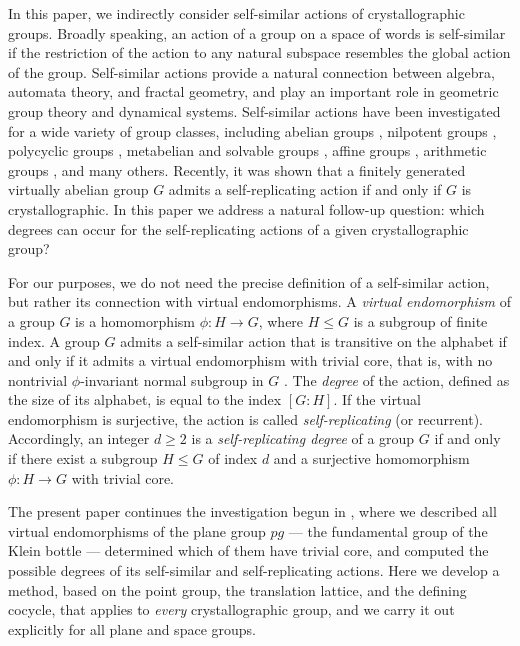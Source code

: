 \documentclass[draft]{adm-paper}
\theoremstyle{definition}
\begin{document}
In this paper, we indirectly consider self-similar actions of crystallographic groups. Broadly speaking, an action of
a group on a space of words is self-similar if the restriction of the action to any natural subspace resembles the
global action of the group. Self-similar actions provide a natural connection between algebra, automata theory, and
fractal geometry, and play an important role in geometric group theory and dynamical systems.
Self-similar actions have been investigated for a wide variety of group classes, including abelian groups
\cite{NekrashevychSidki2004,BrunnerSidki2010Abelian,DantasAtAll2023abelian}, nilpotent groups
\cite{BerlattoSidki2007nilpotent,BondarenkoKravchenko2014nilpotent,Mathieu2021Nilpotent}, polycyclic groups
\cite{DantasAtAll2027polycyclic}, metabelian and solvable groups
\cite{BartholdiSunic,KochloukovaSidki2020metabilian,BerlattoAtAll2023soluble,Kochloukova2026soluble}, affine groups
\cite{BrunnerSidki1998}, arithmetic groups \cite{Kapovich2012}, and many others. Recently, it was shown
\cite{Bondarenko2026} that a finitely generated virtually abelian group $G$ admits a self-replicating action if and only
if $G$ is crystallographic. In this paper we address a natural follow-up question: which degrees can occur for the
self-replicating actions of a given crystallographic group?

For our purposes, we do not need the precise definition of a self-similar action, but rather its connection with virtual
endomorphisms. A \emph{virtual endomorphism} of a group $G$ is a homomorphism $\phi:H\rightarrow G$, where $H\le G$ is
a subgroup of finite index. A group $G$ admits a self-similar action that is transitive on the alphabet if and only if
it admits a virtual endomorphism with trivial core, that is, with no nontrivial $\phi$-invariant
normal subgroup in $G$ \cite[Proposition 2.7.5]{Nekrashevych:Self-similar}. The \emph{degree} of the action,
defined as the size of its alphabet, is equal to the index $[G:H]$. If the virtual endomorphism is surjective, the action is
called \emph{self-replicating} (or recurrent). Accordingly, an integer $d\geq 2$ is a \emph{self-replicating degree}
of a group $G$ if and only if there exist a subgroup $H\leq G$ of index $d$ and a surjective homomorphism
$\phi:H\rightarrow G$ with trivial core.

The present paper continues the investigation begun in \cite{BondZash2024pg}, where we described all virtual
endomorphisms of the plane group $pg$ --- the fundamental group of the Klein bottle --- determined which of them have trivial core, and computed the possible degrees of its self-similar and self-replicating actions. Here we develop a
method, based on the point group, the translation lattice, and the defining cocycle, that applies to \emph{every}
crystallographic group, and we carry it out explicitly for all plane and space groups.
\end{document}
